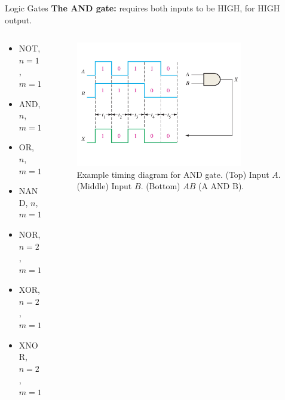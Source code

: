 \documentclass{beamer}
\begin{document}
\begin{frame}{Logic Gates}
\textbf{The AND gate:} requires both inputs to be HIGH, for HIGH output. \\ \vspace{0.5cm}
\begin{columns}[T]
\begin{column}{0.5\textwidth}
\begin{itemize}
\item \alert{NOT, $n=1$, $m=1$}
\item \alert{AND, $n$, $m=1$}
\item OR, $n$, $m=1$
\item NAND, $n$, $m=1$
\item NOR, $n=2$, $m=1$
\item XOR, $n=2$, $m=1$
\item XNOR, $n=2$, $m=1$
\end{itemize}
\end{column}
\begin{column}{0.5\textwidth}
\begin{figure}
\centering
\includegraphics[width=0.8\textwidth]{figures/TimingAnd.pdf}
\caption{\label{fig:and2} Example timing diagram for AND gate.  (Top) Input $A$.  (Middle) Input $B$. (Bottom) $AB$ (A AND B).}
\end{figure}
\end{column}
\end{columns}
\end{frame}
\end{document}
